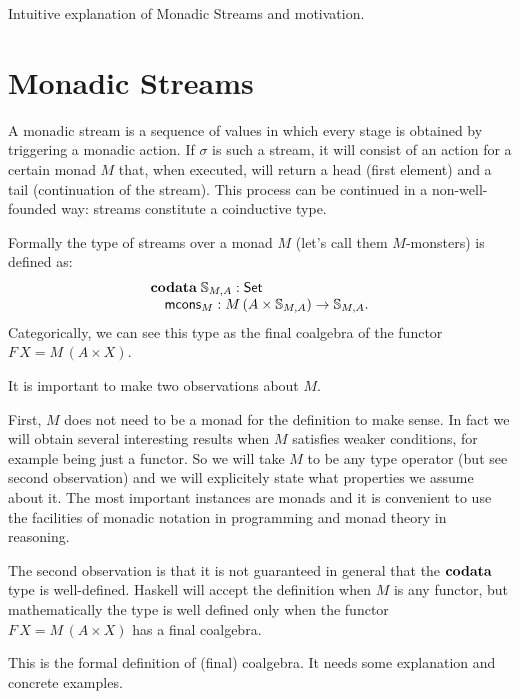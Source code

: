 \documentclass{article}
\begin{document}
Intuitive explanation of Monadic Streams and motivation.

\section{Monadic Streams}

A monadic stream is a sequence of values in which every stage is obtained by triggering a monadic action.
If $\sigma$ is such a stream, it will consist of an action for a certain monad $M$ that, when executed, will return a head (first element) and a tail (continuation of the stream).
This process can be continued in a non-well-founded way: streams constitute a coinductive type.

Formally the type of streams over a monad $M$ (let's call them $M$-monsters) is defined as:
$$
\begin{array}[t]{l}
\mathbf{codata}\;
\mathbb{S}_{M,A}:\mathsf{Set}\\
\quad \mathsf{mcons}_M: M\,(A\times \mathbb{S}_{M,A})\rightarrow\mathbb{S}_{M,A}.
\end{array}
$$
Categorically, we can see this type as the final coalgebra of the functor $F\,X = M\,(A\times X)$.

It is important to make two observations about $M$.

First, $M$ does not need to be a monad for the definition to make sense.
In fact we will obtain several interesting results when $M$ satisfies weaker conditions, for example being just a functor.
So we will take $M$ to be any type operator (but see second observation) and we will explicitely state what properties we assume about it.
The most important instances are monads and it is convenient to use the facilities of monadic notation in programming and monad theory in reasoning.

The second observation is that it is not guaranteed in general that the $\mathbf{codata}$ type is well-defined.
Haskell will accept the definition when $M$ is any functor, but mathematically the type is well defined only when the functor $F\,X = M\,(A\times X)$ has a final coalgebra.

\begin{vcomment}
This is the formal definition of (final) coalgebra. It needs some explanation and concrete examples.
\end{vcomment}
\end{document}

